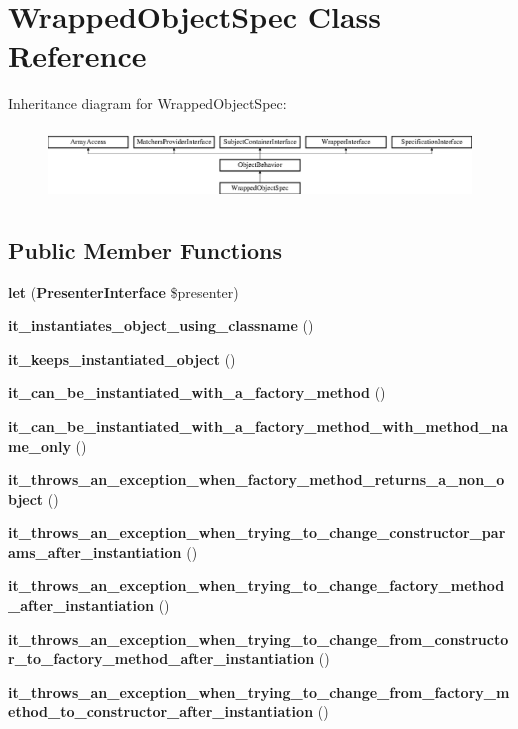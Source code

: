 \section{Wrapped\+Object\+Spec Class Reference}
\label{classspec_1_1_php_spec_1_1_wrapper_1_1_subject_1_1_wrapped_object_spec}
Inheritance diagram for Wrapped\+Object\+Spec\+:\begin{figure}[H]
\begin{center}
\leavevmode
\includegraphics[height=1.953488cm]{classspec_1_1_php_spec_1_1_wrapper_1_1_subject_1_1_wrapped_object_spec}
\end{center}
\end{figure}
\subsection*{Public Member Functions}
\begin{DoxyCompactItemize}
\item 
{\bf let} ({\bf Presenter\+Interface} \$presenter)
\item 
{\bf it\+\_\+instantiates\+\_\+object\+\_\+using\+\_\+classname} ()
\item 
{\bf it\+\_\+keeps\+\_\+instantiated\+\_\+object} ()
\item 
{\bf it\+\_\+can\+\_\+be\+\_\+instantiated\+\_\+with\+\_\+a\+\_\+factory\+\_\+method} ()
\item 
{\bf it\+\_\+can\+\_\+be\+\_\+instantiated\+\_\+with\+\_\+a\+\_\+factory\+\_\+method\+\_\+with\+\_\+method\+\_\+name\+\_\+only} ()
\item 
{\bf it\+\_\+throws\+\_\+an\+\_\+exception\+\_\+when\+\_\+factory\+\_\+method\+\_\+returns\+\_\+a\+\_\+non\+\_\+object} ()
\item 
{\bf it\+\_\+throws\+\_\+an\+\_\+exception\+\_\+when\+\_\+trying\+\_\+to\+\_\+change\+\_\+constructor\+\_\+params\+\_\+after\+\_\+instantiation} ()
\item 
{\bf it\+\_\+throws\+\_\+an\+\_\+exception\+\_\+when\+\_\+trying\+\_\+to\+\_\+change\+\_\+factory\+\_\+method\+\_\+after\+\_\+instantiation} ()
\item 
{\bf it\+\_\+throws\+\_\+an\+\_\+exception\+\_\+when\+\_\+trying\+\_\+to\+\_\+change\+\_\+from\+\_\+constructor\+\_\+to\+\_\+factory\+\_\+method\+\_\+after\+\_\+instantiation} ()
\item 
{\bf it\+\_\+throws\+\_\+an\+\_\+exception\+\_\+when\+\_\+trying\+\_\+to\+\_\+change\+\_\+from\+\_\+factory\+\_\+method\+\_\+to\+\_\+constructor\+\_\+after\+\_\+instantiation} ()
\end{DoxyCompactItemize}

